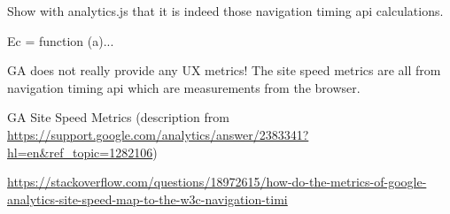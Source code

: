 Show with analytics.js that it is indeed those navigation timing api calculations.

Ec = function (a)...




GA does not really provide any UX metrics! The site speed metrics are all from navigation timing api which are measurements from the browser.

GA Site Speed Metrics (description from \url{https://support.google.com/analytics/answer/2383341?hl=en&ref_topic=1282106})

\url{https://stackoverflow.com/questions/18972615/how-do-the-metrics-of-google-analytics-site-speed-map-to-the-w3c-navigation-timi}

